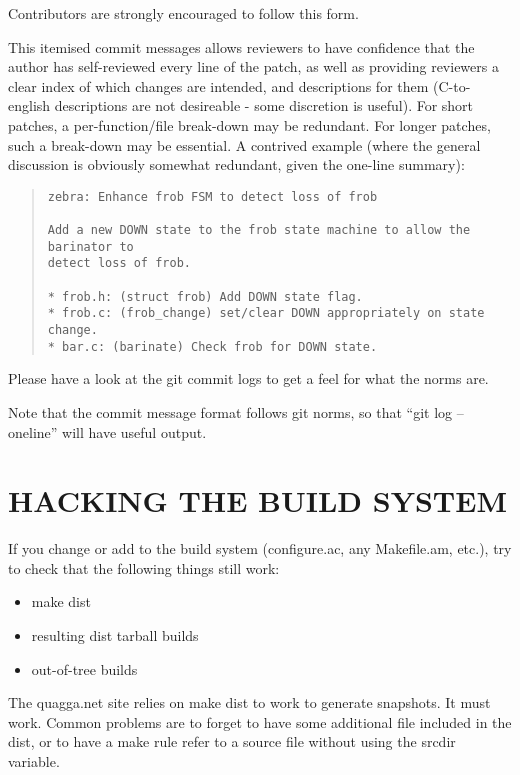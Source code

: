 \documentclass[oneside]{article}
\begin{document}
Contributors are strongly encouraged to follow this form.

This itemised commit messages allows reviewers to have confidence that the
author has self-reviewed every line of the patch, as well as providing
reviewers a clear index of which changes are intended, and descriptions for
them (C-to-english descriptions are not desireable - some discretion is
useful).  For short patches, a per-function/file break-down may be
redundant.  For longer patches, such a break-down may be essential.  A
contrived example (where the general discussion is obviously somewhat
redundant, given the one-line summary):

\begin{quote}\begin{verbatim}
zebra: Enhance frob FSM to detect loss of frob

Add a new DOWN state to the frob state machine to allow the barinator to
detect loss of frob.

* frob.h: (struct frob) Add DOWN state flag.
* frob.c: (frob_change) set/clear DOWN appropriately on state change.
* bar.c: (barinate) Check frob for DOWN state.
\end{verbatim}\end{quote}

Please have a look at the git commit logs to get a feel for what the norms
are.

Note that the commit message format follows git norms, so that ``git
log --oneline'' will have useful output.

\section{HACKING THE BUILD SYSTEM}

If you change or add to the build system (configure.ac, any Makefile.am,
etc.), try to check that the following things still work:

\begin{itemize}
\item make dist
\item resulting dist tarball builds
\item out-of-tree builds
\end{itemize}

The quagga.net site relies on make dist to work to generate snapshots. It
must work. Common problems are to forget to have some additional file
included in the dist, or to have a make rule refer to a source file without
using the srcdir variable.
\end{document}
